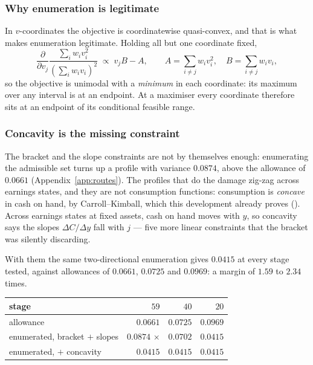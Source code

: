 \subsubsection*{Why enumeration is legitimate}

In $v$-coordinates the objective is coordinatewise quasi-convex, and that is what makes enumeration
legitimate. Holding all but one coordinate fixed,
\[
  \frac{\partial}{\partial v_j}\frac{\sum_iw_iv_i^{2}}{(\sum_iw_iv_i)^{2}}
  \;\propto\;v_jB-A,\qquad A=\sum_{i\ne j}w_iv_i^{2},\quad B=\sum_{i\ne j}w_iv_i,
\]
so the objective is unimodal with a \emph{minimum} in each coordinate: its maximum over any interval
is at an endpoint. At a maximiser every coordinate therefore sits at an endpoint of its conditional
feasible range.

\subsubsection*{Concavity is the missing constraint}

The bracket and the slope constraints are not by themselves enough: enumerating the admissible set
turns up a profile with variance $0.0874$, above the allowance of $0.0661$
(Appendix~\ref{app:routes}). The profiles that do the damage zig-zag across earnings states, and they
are not consumption functions: consumption is \emph{concave} in cash on hand, by Carroll--Kimball, which this development
already proves (). Across earnings states at fixed assets, cash on
hand moves with $y$, so concavity says the slopes $\Delta C/\Delta y$ fall with $j$ --- five more
linear constraints that the bracket was silently discarding.

With them the same two-directional enumeration gives $0.0415$ at every stage tested, against
allowances of $0.0661$, $0.0725$ and $0.0969$: a margin of $1.59$ to $2.34$ times.

\begin{center}
\begin{tabular}{lrrr}
\toprule
stage & $59$ & $40$ & $20$\\
\midrule
allowance & $0.0661$ & $0.0725$ & $0.0969$\\
enumerated, bracket $+$ slopes & $0.0874$ $\times$ & $0.0702$ & $0.0415$\\
enumerated, $+$ concavity & $\mathbf{0.0415}$ & $\mathbf{0.0415}$ & $\mathbf{0.0415}$\\
\bottomrule
\end{tabular}
\end{center}

